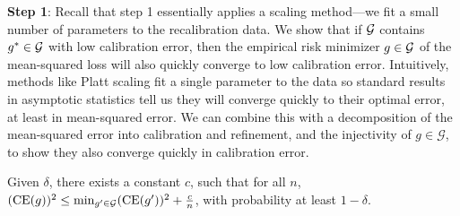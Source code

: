 \textbf{Step 1}: Recall that step 1 essentially applies a scaling method---we fit a small number of parameters to the recalibration data.
We show that if $\mathcal{G}{}$ contains $g^* \in \mathcal{G}{}$ with low calibration error, then the empirical risk minimizer $g \in \mathcal{G}{}$ of the mean-squared loss will also quickly converge to low calibration error.
Intuitively, methods like Platt scaling fit a single parameter to the data so standard results in asymptotic statistics tell us they will converge quickly to their optimal error, at least in mean-squared error.
We can combine this with a decomposition of the mean-squared error into calibration and refinement, and the injectivity of $g \in \mathcal{G}$, to show they also converge quickly in calibration error.

\begin{lemma}
\label{lem:platt_scaling_bound}
Given $\delta$, there exists a constant $c$, such that for all $n$, $(\textup{CE}(g))^2 \leq \min_{g' \in \mathcal{G}{}}(\textup{CE}(g'))^2 + \frac{c}{n}$, with probability at least $1 - \delta$.
\end{lemma}

